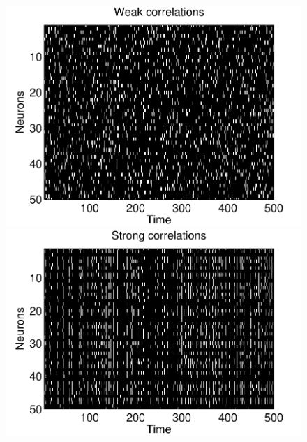 %
\begin{figure}[h]
\centering
\begin{minipage}[c]{0.45\hsize}
\includegraphics[width=\hsize]{../figs/Figure7b_raster_weak}
\end{minipage}
\begin{minipage}[c]{0.45\hsize}
\includegraphics[width=\hsize]{../figs/Figure7a_raster_strong}
\end{minipage}
\begin{minipage}[c]{0.45\hsize}

\end{minipage}
\end{figure}
